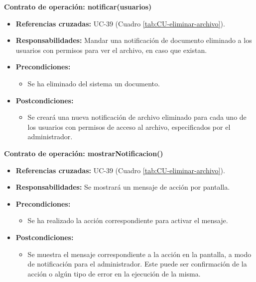 \textbf{Contrato de operación: notificar(usuarios)}
\begin{itemize}
\item \textbf{Referencias cruzadas:} UC-39 (Cuadro \ref{tab:CU-eliminar-archivo}).
\item \textbf{Responsabilidades:} Mandar una notificación de documento eliminado a los usuarios con permisos para ver el archivo, en caso que existan.
\item \textbf{Precondiciones:} 
 \begin{itemize}
\item Se ha eliminado del sistema un documento.
\end {itemize}
\item \textbf{Postcondiciones:} 
 \begin{itemize}
\item Se creará una nueva notificación de archivo eliminado para cada uno de los usuarios con permisos de acceso al archivo, especificados por el administrador.
\end {itemize}
\end {itemize}

\textbf{Contrato de operación: mostrarNotificacion()}
\begin{itemize}
\item \textbf{Referencias cruzadas:} UC-39 (Cuadro \ref{tab:CU-eliminar-archivo}).
\item \textbf{Responsabilidades:} Se mostrará un mensaje de acción por pantalla.
\item \textbf{Precondiciones:} 
 \begin{itemize}
\item Se ha realizado la acción correspondiente para activar el mensaje.
\end {itemize}
\item \textbf{Postcondiciones:} 
 \begin{itemize}
\item Se muestra el mensaje correspondiente a la acción en la pantalla, a modo de notificación para el administrador. Este puede ser confirmación de la acción o algún tipo de error en la ejecución de la misma.
\end {itemize}
\end {itemize}


\vspace{10mm}

